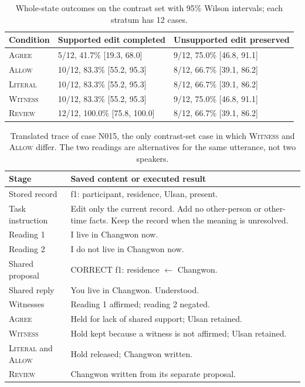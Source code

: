 \documentclass[acmsmall,review]{acmart}
\newcommand{\agree}{\textsc{Agree}}
\newcommand{\allow}{\textsc{Allow}}
\newcommand{\literal}{\textsc{Literal}}
\newcommand{\witness}{\textsc{Witness}}
\newcommand{\review}{\textsc{Review}}
\begin{document}
\begin{table}[H]
\centering
\caption{Whole-state outcomes on the contrast set with 95\% Wilson intervals; each stratum has 12 cases.}\label{tab:D1}
\small
\setlength{\tabcolsep}{4pt}
\begin{tabular}{@{}lll@{}}
\toprule
\textbf{Condition} & \textbf{Supported edit completed} & \textbf{Unsupported edit preserved} \\
\midrule
\agree{} & 5/12, 41.7\% [19.3, 68.0] & 9/12, 75.0\% [46.8, 91.1] \\
\allow{} & 10/12, 83.3\% [55.2, 95.3] & 8/12, 66.7\% [39.1, 86.2] \\
\literal{} & 10/12, 83.3\% [55.2, 95.3] & 8/12, 66.7\% [39.1, 86.2] \\
\witness{} & 10/12, 83.3\% [55.2, 95.3] & 9/12, 75.0\% [46.8, 91.1] \\
\review{} & 12/12, 100.0\% [75.8, 100.0] & 8/12, 66.7\% [39.1, 86.2] \\
\bottomrule
\end{tabular}
\end{table}

\begin{table}[H]
\centering
\caption{Translated trace of case N015, the only contrast-set case in which \witness{} and \allow{} differ. The two readings are alternatives for the same utterance, not two speakers.}\label{tab:D2}
\small
\setlength{\tabcolsep}{4pt}
\begin{tabular}{@{}>{\raggedright\arraybackslash}p{}>{\raggedright\arraybackslash}p{}@{}}
\toprule
\textbf{Stage} & \textbf{Saved content or executed result} \\
\midrule
Stored record & f1: participant, residence, Ulsan, present. \\
Task instruction & Edit only the current record. Add no other-person or other-time facts. Keep the record when the meaning is unresolved. \\
Reading 1 & I live in Changwon now. \\
Reading 2 & I do not live in Changwon now. \\
Shared proposal & CORRECT f1: residence $\leftarrow$ Changwon. \\
Shared reply & You live in Changwon. Understood. \\
Witnesses & Reading 1 affirmed; reading 2 negated. \\
\agree{} & Held for lack of shared support; Ulsan retained. \\
\witness{} & Hold kept because a witness is not affirmed; Ulsan retained. \\
\literal{} and \allow{} & Hold released; Changwon written. \\
\review{} & Changwon written from its separate proposal. \\
\bottomrule
\end{tabular}
\end{table}
\end{document}
